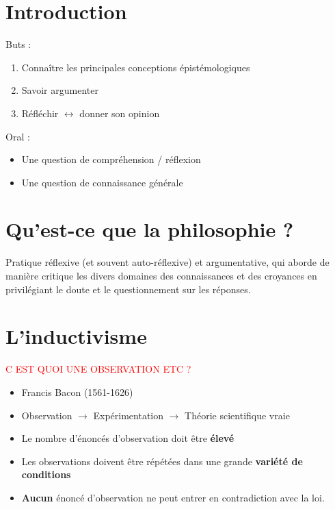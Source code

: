 \documentclass[fleqn,letterpaper, 12pt]{article}
\begin{document}
	
	
	
	
	
	
	\section{Introduction}
	
	Buts : 
	\begin{enumerate}
		\item Connaître les principales conceptions épistémologiques
		\item Savoir argumenter
		\item Réfléchir $\leftrightarrow$  donner son opinion
	\end{enumerate}
	
	Oral :
	\begin{itemize}
		\item Une question de compréhension / réflexion
		\item Une question de connaissance générale
	\end{itemize}

	\section{Qu'est-ce que la philosophie ?}
	
	Pratique réflexive (et souvent auto-réflexive) et argumentative, qui aborde de manière critique les divers domaines des connaissances et des croyances en privilégiant le doute et le questionnement sur les réponses.
	
	\section{L'inductivisme}
	
	\textcolor{red}{C EST QUOI UNE OBSERVATION ETC ?}
	
	\begin{itemize}
		\item Francis Bacon (1561-1626)
		\item Observation $\rightarrow$ Expérimentation $\rightarrow$ Théorie scientifique vraie
		\item Le nombre d'énoncés d'observation doit être \textbf{élevé}
		\item Les observations doivent être répétées dans une grande \textbf{variété de conditions}
		\item \textbf{Aucun} énoncé d'observation ne peut entrer en contradiction avec la loi.
	\end{itemize}
	
\end{document}
